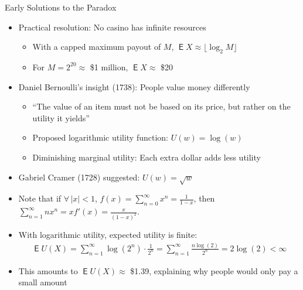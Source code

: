 \documentclass[10pt]{beamer}
\DeclareMathOperator\expc{\mathsf{E}}
\begin{document}
\begin{frame}{Early Solutions to the Paradox}
  \begin{itemize}[<+->]
    \item Practical resolution: No casino has infinite resources
      \begin{itemize}
        \item With a capped maximum payout of $M$, $\expc{X} \approx \lfloor \log_2 M \rfloor$
        \item For $M = 2^{20} \approx$ \$1 million, $\expc{X} \approx$ \$20
      \end{itemize}
    \item Daniel Bernoulli's insight (1738): People value money differently
      \begin{itemize}
        \item ``The value of an item must not be based on its price, but rather on the utility it yields''
        \item Proposed logarithmic utility function: $U(w) = \log(w)$
        \item Diminishing marginal utility: Each extra dollar adds less utility
      \end{itemize}
    \item Gabriel Cramer (1728) suggested: $U(w) = \sqrt{w}$ 
    \item Note that if $\forall\,|x| < 1$, $f(x) = \sum_{n=0}^\infty x^n = \frac{1}{1 - x}$, then $\sum_{n=1}^\infty nx^n = xf'(x) = \frac{x}{(1 - x)^2}$.
    \item With logarithmic utility, expected utility is finite:
      \begin{align*}
        \expc{U(X)} = \sum_{n=1}^{\infty} \log(2^n) \cdot \frac{1}{2^n} = \sum_{n=1}^{\infty} \frac{n \log(2)}{2^n} = 2\log(2) < \infty
      \end{align*}
    \item This amounts to $\expc{U(X)} \approx$ \$1.39, explaining why people would only pay a small amount
  \end{itemize}
\end{frame}
\end{document}
